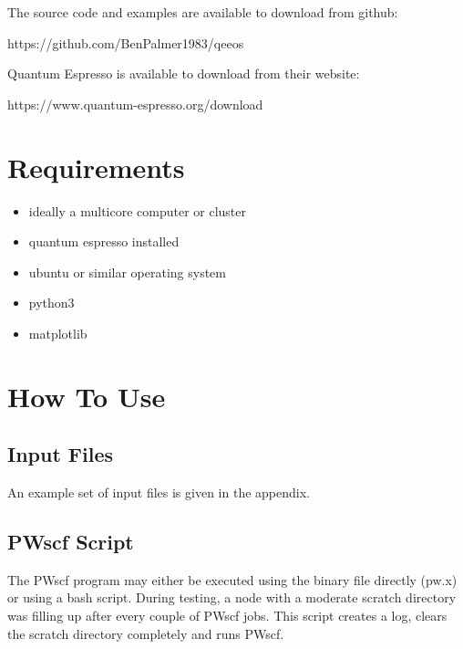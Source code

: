 \documentclass[12pt,twoside]{manual}
\begin{document}
The source code and examples are available to download from github:

https://github.com/BenPalmer1983/qeeos

Quantum Espresso is available to download from their website:

https://www.quantum-espresso.org/download



\section{Requirements}

\begin{itemize}
\item ideally a multicore computer or cluster
\item quantum espresso installed
\item ubuntu or similar operating system
\item python3
\item matplotlib
\end{itemize}



\section{How To Use}

\subsection{Input Files}

An example set of input files is given in the appendix.



\subsection{PWscf Script}

The PWscf program may either be executed using the binary file directly (pw.x) or using a bash script.  During testing, a node with a moderate scratch directory was filling up after every couple of PWscf jobs.  This script creates a log, clears the scratch directory completely and runs PWscf.
\end{document}
